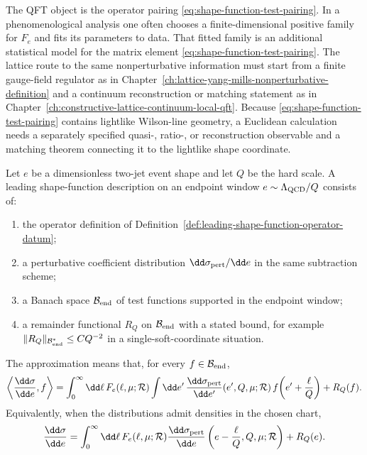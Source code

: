 The QFT object is the operator pairing
\eqref{eq:shape-function-test-pairing}.  In a phenomenological analysis one
often chooses a finite-dimensional positive family for \(F_e\) and fits its
parameters to data.  That fitted family is an additional statistical model
for the matrix element \eqref{eq:shape-function-test-pairing}.
The lattice route to the same nonperturbative information must start from a
finite gauge-field regulator as in
Chapter~\ref{ch:lattice-yang-mills-nonperturbative-definition} and a
continuum reconstruction or matching statement as in
Chapter~\ref{ch:constructive-lattice-continuum-local-qft}.  Because
\eqref{eq:shape-function-test-pairing} contains lightlike Wilson-line
geometry, a Euclidean calculation needs a separately specified quasi-,
ratio-, or reconstruction observable and a matching theorem connecting it to
the lightlike shape coordinate.

\begin{controlledapproximation}
\label{ca:leading-endpoint-shape-function-convolution}
Let \(e\) be a dimensionless two-jet event shape and let \(Q\) be the hard
scale.  A leading shape-function description on an endpoint window
\(e\sim \Lambda_{\rm QCD}/Q\) consists of:
\begin{enumerate}
  \item the operator definition of
  Definition~\ref{def:leading-shape-function-operator-datum};
  \item a perturbative coefficient distribution
  \(\dd\sigma_{\rm pert}/\dd e\) in the same subtraction scheme;
  \item a Banach space \(\mathcal B_{\rm end}\) of test functions supported
  in the endpoint window;
  \item a remainder functional \(R_Q\) on \(\mathcal B_{\rm end}\) with a
  stated bound, for example
  \(\lVert R_Q\rVert_{\mathcal B_{\rm end}^\ast}
  \leq C Q^{-2}\) in a single-soft-coordinate situation.
\end{enumerate}
The approximation means that, for every \(f\in\mathcal B_{\rm end}\),
\begin{equation}
  \left\langle \frac{\dd\sigma}{\dd e},f\right\rangle
  =
  \int_0^\infty\dd\ell\,F_e(\ell,\mu;\mathcal R)
  \int\dd e'\,
  \frac{\dd\sigma_{\rm pert}}{\dd e'}(e',Q,\mu;\mathcal R)\,
  f\!\left(e'+\frac{\ell}{Q}\right)
  +R_Q(f).
  \label{eq:shape-function-distributional-convolution}
\end{equation}
Equivalently, when the distributions admit densities in the chosen chart,
\begin{equation}
  \frac{\dd\sigma}{\dd e}
  =
  \int_0^\infty\dd\ell\,
  F_e(\ell,\mu;\mathcal R)
  \frac{\dd\sigma_{\rm pert}}{\dd e}
  \left(e-\frac{\ell}{Q},Q,\mu;\mathcal R\right)
  +R_Q(e).
  \label{eq:shape-function-density-convolution}
\end{equation}
\end{controlledapproximation}

